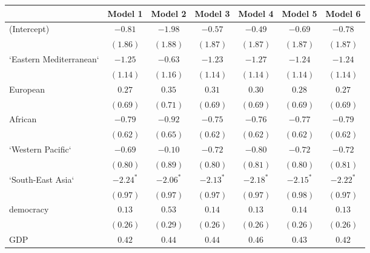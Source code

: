 
\begin{table}[!h]
\begin{center}
\begin{tabular}{l c c c c c c }
\toprule
 & Model 1 & Model 2 & Model 3 & Model 4 & Model 5 & Model 6 \\
\midrule
(Intercept)             & $-0.81$      & $-1.98$      & $-0.57$      & $-0.49$      & $-0.69$      & $-0.78$      \\
                        & $(1.86)$     & $(1.88)$     & $(1.87)$     & $(1.87)$     & $(1.87)$     & $(1.87)$     \\
`Eastern Mediterranean` & $-1.25$      & $-0.63$      & $-1.23$      & $-1.27$      & $-1.24$      & $-1.24$      \\
                        & $(1.14)$     & $(1.16)$     & $(1.14)$     & $(1.14)$     & $(1.14)$     & $(1.14)$     \\
European                & $0.27$       & $0.35$       & $0.31$       & $0.30$       & $0.28$       & $0.27$       \\
                        & $(0.69)$     & $(0.71)$     & $(0.69)$     & $(0.69)$     & $(0.69)$     & $(0.69)$     \\
African                 & $-0.79$      & $-0.92$      & $-0.75$      & $-0.76$      & $-0.77$      & $-0.79$      \\
                        & $(0.62)$     & $(0.65)$     & $(0.62)$     & $(0.62)$     & $(0.62)$     & $(0.62)$     \\
`Western Pacific`       & $-0.69$      & $-0.10$      & $-0.72$      & $-0.80$      & $-0.72$      & $-0.72$      \\
                        & $(0.80)$     & $(0.89)$     & $(0.80)$     & $(0.81)$     & $(0.80)$     & $(0.81)$     \\
`South-East Asia`       & $-2.24^{*}$  & $-2.06^{*}$  & $-2.13^{*}$  & $-2.18^{*}$  & $-2.15^{*}$  & $-2.22^{*}$  \\
                        & $(0.97)$     & $(0.97)$     & $(0.97)$     & $(0.97)$     & $(0.98)$     & $(0.97)$     \\
democracy               & $0.13$       & $0.53$       & $0.14$       & $0.13$       & $0.14$       & $0.13$       \\
                        & $(0.26)$     & $(0.29)$     & $(0.26)$     & $(0.26)$     & $(0.26)$     & $(0.26)$     \\
GDP                     & $0.42$       & $0.44$       & $0.44$       & $0.46$       & $0.43$       & $0.42$       \\

\end{tabular}
\end{center}
\end{table}
